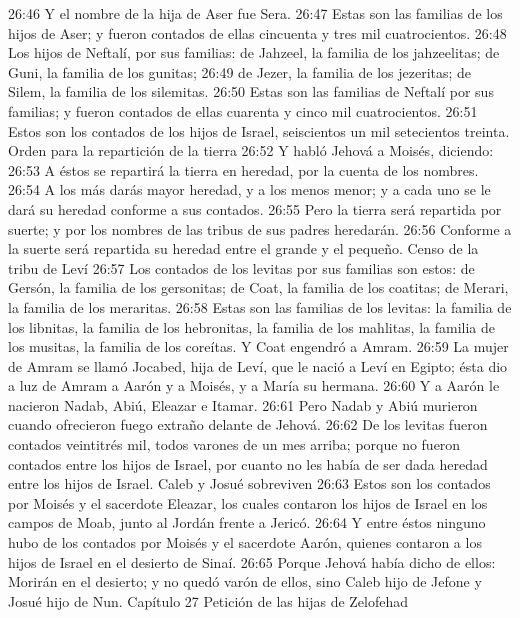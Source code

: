 26:46 Y el nombre de la hija de Aser fue Sera.  
26:47 Estas son las familias de los hijos de Aser; y fueron contados de ellas cincuenta y tres mil cuatrocientos.  
26:48 Los hijos de Neftalí, por sus familias: de Jahzeel, la familia de los jahzeelitas; de Guni, la familia de los gunitas;  
26:49 de Jezer, la familia de los jezeritas; de Silem, la familia de los silemitas.  
26:50 Estas son las familias de Neftalí por sus familias; y fueron contados de ellas cuarenta y cinco mil cuatrocientos.  
26:51 Estos son los contados de los hijos de Israel, seiscientos un mil setecientos treinta.  
Orden para la repartición de la tierra 
26:52 Y habló Jehová a Moisés, diciendo:  
26:53 A éstos se repartirá la tierra en heredad, por la cuenta de los nombres.  
26:54 A los más darás mayor heredad, y a los menos menor; y a cada uno se le dará su heredad conforme a sus contados.  
26:55 Pero la tierra será repartida por suerte; y por los nombres de las tribus de sus padres heredarán.  
26:56 Conforme a la suerte será repartida su heredad entre el grande y el pequeño.  
Censo de la tribu de Leví  
26:57 Los contados de los levitas por sus familias son estos: de Gersón, la familia de los gersonitas; de Coat, la familia de los coatitas; de Merari, la familia de los meraritas.  
26:58 Estas son las familias de los levitas: la familia de los libnitas, la familia de los hebronitas, la familia de los mahlitas, la familia de los musitas, la familia de los coreítas. Y Coat engendró a Amram.  
26:59 La mujer de Amram se llamó Jocabed, hija de Leví, que le nació a Leví en Egipto; ésta dio a luz de Amram a Aarón y a Moisés, y a María su hermana.  
26:60 Y a Aarón le nacieron Nadab, Abiú, Eleazar e Itamar. 
26:61 Pero Nadab y Abiú murieron cuando ofrecieron fuego extraño delante de Jehová.  
26:62 De los levitas fueron contados veintitrés mil, todos varones de un mes arriba; porque no fueron contados entre los hijos de Israel, por cuanto no les había de ser dada heredad entre los hijos de Israel.  
Caleb y Josué sobreviven  
26:63 Estos son los contados por Moisés y el sacerdote Eleazar, los cuales contaron los hijos de Israel en los campos de Moab, junto al Jordán frente a Jericó.  
26:64 Y entre éstos ninguno hubo de los contados por Moisés y el sacerdote Aarón, quienes contaron a los hijos de Israel en el desierto de Sinaí.  
26:65 Porque Jehová había dicho de ellos: Morirán en el desierto; y no quedó varón de ellos, sino Caleb hijo de Jefone y Josué hijo de Nun. 
Capítulo 27
Petición de las hijas de Zelofehad  

